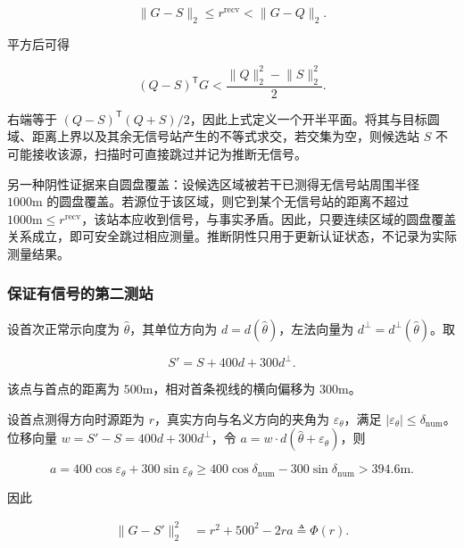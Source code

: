 \begin{equation}
\lVert G-S\rVert_2\le r^{\mathrm{recv}}<\lVert G-Q\rVert_2.
\label{eq:q3_negative_order}
\end{equation}

平方后可得

\begin{equation}
(Q-S)^{\mathsf T}G
<
\frac{\lVert Q\rVert_2^2-\lVert S\rVert_2^2}{2}.
\label{eq:q3_negative_halfplane}
\end{equation}

右端等于 $(Q-S)^{\mathsf T}(Q+S)/2$，因此上式定义一个开半平面。将其与目标圆域、距离上界以及其余无信号站产生的不等式求交，若交集为空，则候选站 $S$ 不可能接收该源，扫描时可直接跳过并记为推断无信号。

另一种阴性证据来自圆盘覆盖：设候选区域被若干已测得无信号站周围半径 $1000\mathrm{m}$ 的圆盘覆盖。若源位于该区域，则它到某个无信号站的距离不超过 $1000\mathrm{m}\le r^{\mathrm{recv}}$，该站本应收到信号，与事实矛盾。因此，只要连续区域的圆盘覆盖关系成立，即可安全跳过相应测量。推断阴性只用于更新认证状态，不记录为实际测量结果。

\subsubsection{保证有信号的第二测站}

设首次正常示向度为 $\hat\theta$，其单位方向为 $d=d(\hat\theta)$，左法向量为 $d^{\perp}=d^{\perp}(\hat\theta)$。取

\begin{equation}
S'=S+400d+300d^{\perp}.
\label{eq:q3_safe_site}
\end{equation}

该点与首点的距离为 $500\mathrm{m}$，相对首条视线的横向偏移为 $300\mathrm{m}$。

设首点测得方向时源距为 $r$，真实方向与名义方向的夹角为 $\varepsilon_\theta$，满足 $|\varepsilon_\theta|\le\delta_{\mathrm{num}}$。位移向量 $w=S'-S=400d+300d^{\perp}$，令 $a=w\cdot d(\hat\theta+\varepsilon_\theta)$，则

\begin{equation}
a
=400\cos\varepsilon_\theta+300\sin\varepsilon_\theta
\ge400\cos\delta_{\mathrm{num}}-300\sin\delta_{\mathrm{num}}
>394.6\mathrm{m}.
\label{eq:q3_projection_bound}
\end{equation}

因此

\begin{equation}
\begin{aligned}
\lVert G-S'\rVert_2^2
&=r^2+500^2-2ra\triangleq\Phi(r).
\end{aligned}
\label{eq:q3_distance_change}
\end{equation}

